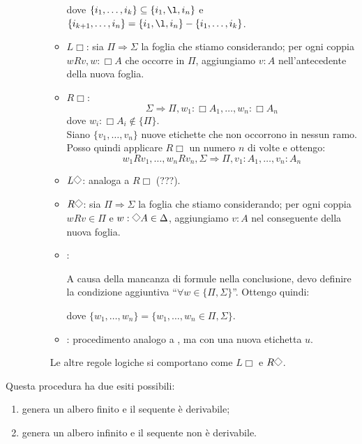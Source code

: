 \documentclass[a4paper,12pt]{article}
\newcommand{\latinmath}[1]{\text{\latinmodern{#1}}} %
\newcommand{\To}{\Rightarrow} %
\newcommand{\Dmd}{\mathord{\vcenter{\hbox{\tikz[baseline=-0.6ex]{\draw[line width=0.4pt, scale=1, rotate=45] (0,0) rectangle (0.2,0.2);}}}}} %
\begin{document}
\begin{defin}
\begin{description}
\begin{enumerate}
\begin{itemize}
				dove $\{i_1, \ldots, i_k\} \subseteq \{i_1, \l, i_n\}$ e $\{i_{k+1}, \ldots, i_n\} = \{i_1, \l, i_n\} -  \{i_1, \ldots, i_k\}$.
				\item $L\Box$: sia $\Pi \To \Sigma$ la foglia che stiamo considerando; per ogni coppia $wRv, w:\Box A$ che occorre in $\Pi$, aggiungiamo $v:A$ nell'antecedente della nuova foglia. 
				\item $R\Box$: $$\Sigma \To \Pi, w_1 : \Box A_1, \ldots, w_n : \Box A_n$$
				dove $w_i : \Box A_i \notin \{\Pi\}$. \\
				Siano $\{v_1, \ldots, v_n\}$ nuove etichette che non occorrono in nessun ramo. Posso quindi applicare $R\Box$ un numero $n$ di volte e ottengo:
				$$w_1Rv_1, \ldots, w_nRv_n, \Sigma \To \Pi, v_1 : A_1, \ldots, v_n : A_n$$
				\item $L\Dmd$: analoga a $R\Box$ (???).
				\item $R\Dmd$: sia $\Pi \To \Sigma$ la foglia che stiamo considerando; per ogni coppia $wRv \in \Pi$ e $w:\Dmd A \in \Delta$, aggiungiamo $v:A$ nel conseguente della nuova foglia. 
				\item \latinmath{Rif}: 
				\begin{mathpar}
					\inferrule*[Right=$\latinmath{Rif}$]{wRw, \Pi \To \Sigma}{\Pi \To \Sigma}
				\end{mathpar}
				A causa della mancanza di formule nella conclusione, devo definire la condizione aggiuntiva \enquote{$\forall w \in \{\Pi, \Sigma\}$}. Ottengo quindi:
				\begin{mathpar}
					\inferrule*[Right=$\latinmath{Rif}$]{w_1Rw_1, \ldots, w_nRw_n, \Pi \To \Sigma}{\Pi \To \Sigma}
				\end{mathpar}
				dove $\{w_1, \ldots, w_n\} = \{w_1, \ldots, w_n \in \Pi, \Sigma\}$.
				\item \latinmath{Ser}: procedimento analogo a \latinmath{Rif}, ma con una nuova etichetta $u$.
			\end{itemize}
			Le altre regole logiche si comportano come $L\Box$ e $R\Dmd$. 
		\end{enumerate}
	\end{description}
	Questa procedura ha due esiti possibili:
	\begin{enumerate}
		\item genera un albero finito e il sequente è derivabile;
		\item genera un albero infinito e il sequente non è derivabile. \\
	\end{enumerate}
\end{defin}
\end{document}
